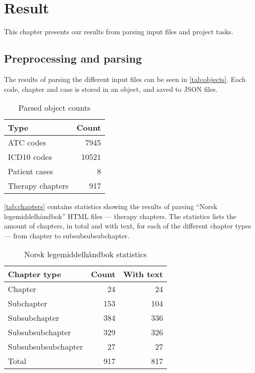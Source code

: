 \chapter{Result}
This chapter presents our results from parsing input files and project tasks.


\section{Preprocessing and parsing}
The results of parsing the different input files can be seen in
\autoref{tab:objects}. Each code, chapter and case is stored in an object,
and saved to JSON files.
\begin{table}[htbp] \footnotesize \center
\caption{Parsed object counts\label{tab:objects}}
\begin{tabular}{l r}
    \toprule
    Type & Count \\
    \midrule
	ATC codes & 7945 \\
	ICD10 codes & 10521 \\
	Patient cases & 8 \\
	Therapy chapters & 917 \\
	\bottomrule
\end{tabular}
\end{table}

\autoref{tab:chapters} contains statistics showing the results of parsing
``Norsk legemiddelhåndbok'' HTML files --- therapy chapters. The statistics
lists the amount of chapters, in total and with text, for each of the
different chapter types --- from chapter to subsubsubsubchapter.
\begin{table}[htbp] \footnotesize \center
\caption{Norsk legemiddelhåndbok statistics\label{tab:chapters}}
\begin{tabular}{l r r}
    \toprule
    Chapter type & Count & With text \\
    \midrule
	Chapter & 24 & 24 \\
	Subchapter & 153 & 104 \\
	Subsubchapter & 384 & 336 \\
	Subsubsubchapter & 329 & 326 \\
	Subsubsubsubchapter & 27 & 27 \\
    \midrule
	Total & 917 & 817 \\
	\bottomrule
\end{tabular}
\end{table}

